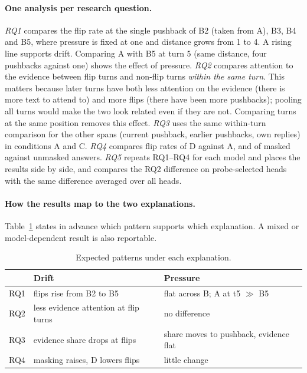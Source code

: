\documentclass[sigconf,nonacm]{acmart}
\newcommand{\cond}[1]{\textsf{#1}}
\begin{document}
\paragraph{One analysis per research question.}
\emph{RQ1} compares the flip rate at the single pushback of \cond{B2} (taken from \cond{A}), \cond{B3},
\cond{B4} and \cond{B5}, where pressure is fixed at one and distance grows from 1 to 4. A rising line
supports drift. Comparing \cond{A} with \cond{B5} at turn 5 (same distance, four pushbacks against one)
shows the effect of pressure.
\emph{RQ2} compares attention to the evidence between flip turns and non-flip turns \emph{within the same
turn}. This matters because later turns have both less attention on the evidence (there is more text to
attend to) and more flips (there have been more pushbacks); pooling all turns would make the two look
related even if they are not. Comparing turns at the same position removes this effect.
\emph{RQ3} uses the same within-turn comparison for the other spans (current pushback, earlier pushbacks,
own replies) in conditions \cond{A} and \cond{C}.
\emph{RQ4} compares flip rates of \cond{D} against \cond{A}, and of masked against unmasked answers.
\emph{RQ5} repeats RQ1--RQ4 for each model and places the results side by side, and compares the RQ2
difference on probe-selected heads with the same difference averaged over all heads.

\paragraph{How the results map to the two explanations.} Table~\ref{tab:hypotheses} states in advance
which pattern supports which explanation. A mixed or model-dependent result is also reportable.

\begin{table}[t]
\caption{Expected patterns under each explanation.}
\label{tab:hypotheses}
\small
\begin{tabular}{@{}lp{3.0cm}p{3.0cm}@{}}
\toprule
 & Drift & Pressure \\
\midrule
RQ1 & flips rise from B2 to B5 & flat across B; A at t5 $\gg$ B5 \\
RQ2 & less evidence attention at flip turns & no difference \\
RQ3 & evidence share drops at flips & share moves to pushback, evidence flat \\
RQ4 & masking raises, D lowers flips & little change \\
\bottomrule
\end{tabular}
\end{table}
\end{document}
